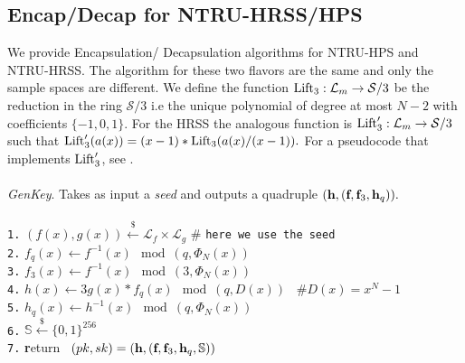 \documentclass{amsart}
\numberwithin{equation}{section}
\begin{document}
 \subsection{Encap/Decap for NTRU-HRSS/HPS}
 We provide Encapsulation/ Decapsulation algorithms for NTRU-HPS and NTRU-HRSS. The algorithm for these two flavors are the same and only the sample spaces are different. We define the function ${\rm{Lift}_3}:{\mathcal{L}}_m\rightarrow {\mathcal{S}}/3$ be the reduction in the ring ${\mathcal{S}}/3$ i.e the unique polynomial of degree at most $N-2$ with coefficients $\{-1,0,1\}.$ For the HRSS the analogous function is ${\rm{Lift}'_3}:{\mathcal{L}}_m\rightarrow {\mathcal{S}}/3$ such that ${\rm{Lift}'_3}(a(x))=(x-1)*{\rm{Lift}_3}(a(x)/(x-1)).$ For a pseudocode that implements ${\rm{Lift}'_3}$, see \cite[Appendix 2 - Algorithm 8]{HRSS-2}.\\\\
 {\it GenKey}. Takes as input a {\it{seed}} and outputs a quadruple $({\textbf h},({\textbf f},{\textbf f}_3,{\textbf h}_q)).$\\\\
\texttt{1.}   $(f(x),g(x))\xleftarrow{\$} {\mathcal{L}}_f\times {\mathcal{L}}_g$ \hspace{10pt} \# {\texttt{here\ we\ use  the seed}}\\
\texttt{2.}  $f_q(x)\leftarrow f^{-1}(x)\mod{(q,\Phi_N(x))}$\\
\texttt{3.}   $f_3(x)\leftarrow f^{-1}(x)\mod{(3,\Phi_N(x))}$\\
\texttt{4.}   $h(x) \leftarrow 3g(x)*f_q(x)\mod{(q,D(x))}$ \ $\# D(x)=x^N-1$\\
\texttt{5.}  $ h_q(x) \leftarrow h^{-1}(x)\mod{(q,\Phi_N(x))}$\ \\  
\texttt{6.}  $ {\mathbb{S}} \xleftarrow{\$} \{0,1\}^{256}$\ \\ 
\texttt{7.}   {\textbf return} \ $(pk,sk)=({\textbf h},({\textbf f},{\textbf f}_3,{\textbf h}_q,{\mathbb{S}}))
 $\\
\end{document}
